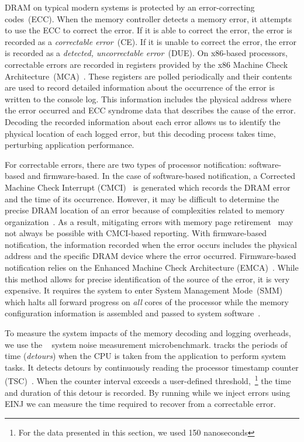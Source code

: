 
DRAM on typical modern systems is protected by an error-correcting
codes~(ECC).  When the memory controller detects a memory error, it attempts to
use the ECC to correct the error.  If it is able to correct the error, the
error is recorded as a \emph{correctable error}~(CE).  If it is unable to
correct the error, the error is recorded as a \emph{detected, uncorrectable
error}~(DUE).  On x86-based processors, correctable errors are recorded in 
registers provided by the x86 Machine Check Architecture~(MCA)~\cite{AMD,IntelGuide}.  
These registers are polled periodically and their contents are used to record
detailed information about the occurrence of the error is written to the console log.
This information includes the physical address where the error occurred and ECC
syndrome data that describes the cause of the error.  Decoding the recorded
information about each error allows us to identify the physical location of
each logged error, but this decoding process takes time, perturbing application
performance.

For correctable errors, there are two types of processor notification: software-based 
and firmware-based.  In the case of software-based notification, a Corrected Machine Check Interrupt
(CMCI)~\cite{IntelGuide,Gottscho:2017:Measuring} is generated which records
the DRAM error and the time of its occurrence.  However, it may be difficult
to determine the precise DRAM location of an error because of complexities related
to memory organization~\cite{Gottscho:2017:Measuring}.  As a result, mitigating
errors with memory page retirement~\cite{Tang:2006:Assessment} may not always
be possible with CMCI-based reporting.  With firmware-based notification, the
information recorded when the error occurs includes the physical address and the
specific DRAM device where the error occurred.  Firmware-based notification relies on the
Enhanced Machine Check Architecture (EMCA)~\cite{MCAEnhancements}.  While this
method allows for precise identification of the source of the error, it is very
expensive.  It requires the system to enter System Management Mode~(SMM) which halts
all forward progress on \emph{all} cores of the processor while the memory configuration 
information is assembled and passed to system software~\cite{Gottscho:2017:Measuring}. 

To measure the system impacts of the memory decoding and logging overheads, we
use the \selfish~\cite{Hoefler:2010:Characterizing} system noise measurement
microbenchmark. \selfish tracks the periods of time (\emph{detours}) when the CPU is
taken from the application to perform system tasks.  It detects detours by continuously reading 
the processor timestamp counter (TSC)~\cite{IntelGuide}.  When the counter interval exceeds a 
user-defined threshold,~\footnote{For the data presented in this section, we used 150 nanoseconds} 
the time and duration of this detour is recorded.  By running \selfish while we inject
errors using EINJ we can measure the time required to recover from a correctable error.

